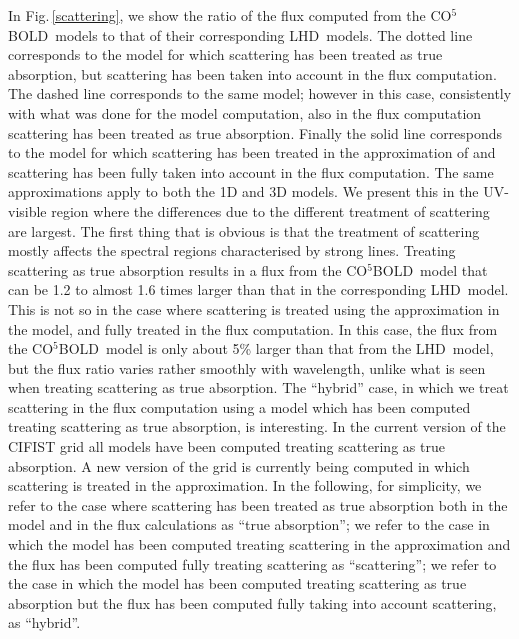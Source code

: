 \documentclass[]{aa}
\newcommand{\cobold}{{\sf CO$^5$BOLD}}
\renewcommand{\lhd}{{\sf LHD}}
\begin{document}
In Fig.\,\ref{scattering}, we show the ratio of the flux computed from the \cobold\
models to that of their corresponding \lhd\ models.
The dotted line corresponds to the model for which scattering
has been treated as true absorption, but scattering has been taken into account
in the flux computation. The dashed line corresponds to the same model; 
however in this case, consistently with what was done for the model
computation, also in the flux computation scattering has been treated as true
absorption. Finally the solid line corresponds to the model 
for which  scattering has been
treated in the approximation of \citet{Hayek} and scattering
has been fully taken into account in the flux computation.
The same approximations apply  to both the 1D and 3D models.
We present this in  the UV-visible region where
the differences due to the different treatment of scattering are largest.
The first thing that is obvious is that the treatment of scattering mostly affects 
the spectral regions characterised by strong lines. Treating scattering as
true absorption results in a flux from the \cobold\
model that can be 1.2 to almost 1.6 times larger
than that in the corresponding \lhd\ model. 
This is not so in the case where scattering is treated using the
\citet{Hayek} approximation in the model, and fully treated in the
flux computation. In this case, the flux from the \cobold\ model
is only about 5\% larger than that from the \lhd\ model, but the flux ratio
varies rather smoothly with wavelength, unlike what is seen when 
treating scattering as true absorption.
The ``hybrid'' case, in which we treat scattering in the flux computation using
a model which has been computed treating scattering as true absorption,
is interesting. In the current version of the CIFIST grid \citep{cifist09}
all models have been computed treating scattering as true absorption. 
A new version of the grid is currently being computed in which 
scattering is treated in the \citet{Hayek} approximation.
In the following, for simplicity, 
we refer to the case where
scattering has been treated as true absorption both in the model 
and in the flux calculations as “true absorption”;
we refer to the case in which
the model has been computed treating scattering in the 
\citet{Hayek} approximation and the flux has been computed
fully treating scattering as ``scattering''; we refer to the
case in which the model has been computed treating scattering
as true absorption but the flux has been computed fully taking into
account scattering, as ``hybrid''.  
 
\end{document}
